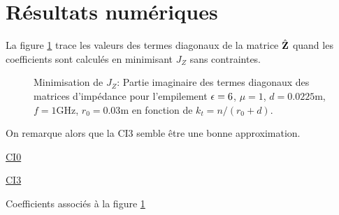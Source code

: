 \section{Résultats numériques}

  La figure \ref{fig:imp_fourier:sphere:hoppe:62:hoibc:mode_2} trace les valeurs des termes diagonaux de la matrice \(\hat{\mathbf{Z}}\) quand les coefficients sont calculés en minimisant \(J_Z\) sans contraintes.
  \begin{figure}[!hbt]
    \centering
    
    \caption[Partie imaginaire de l'opérateur de Calderón, comparé avec les approximations CI0, CI3, CI6 (calculées avec Jz) pour une couche sphérique de matériau de Hoppe \& Rahmat-Samii.]{Minimisation de \(J_Z\): Partie imaginaire des termes diagonaux des matrices d'impédance pour l'empilement \(\epsilon = 6\), \(\mu = 1\), \(d=0.0225\)m, \(f=1\)GHz, \(r_0=0.03\)m en fonction de \(k_t = n / (r_0+d)\).}
    \label{fig:imp_fourier:sphere:hoppe:62:hoibc:mode_2}
  \end{figure}
  On remarque alors que la CI3 semble être une bonne approximation. 

  \begin{table}[!hbt]
    \centering
    \begin{minipage}[t]{0.49\textwidth}
      \vspace{0pt}
      \centering
      \begin{coefftable}{\hyperlink{ci0}{CI0}}
        
      \end{coefftable}
    \end{minipage}
    \begin{minipage}[t]{0.49\textwidth}
      \vspace{0pt}
      \centering
      \begin{coefftable}{\hyperlink{ci3}{CI3}}
        
      \end{coefftable}
    \end{minipage}
    \caption{Coefficients associés à la figure \ref{fig:imp_fourier:sphere:hoppe:62:hoibc:mode_2}}
    \label{tab:imp_fourier:sphere:hoppe:62:hoibc:mode_2}
  \end{table}


